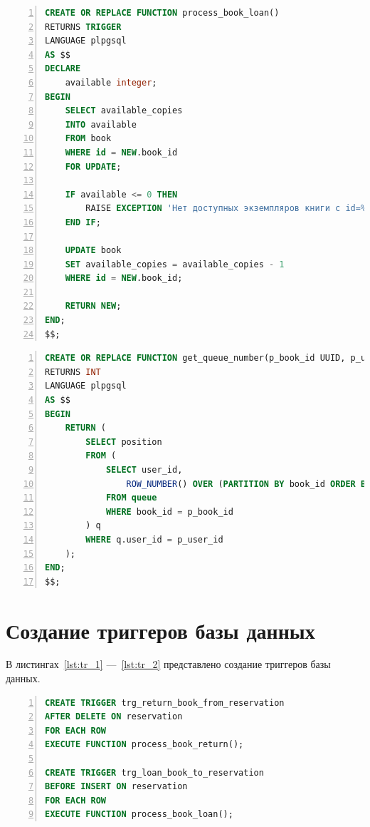 \begin{center}
	\captionsetup{justification=raggedright,singlelinecheck=off}
	\begin{lstlisting}[language=sql, frame=single, numbers=left, label=lst:func_2, caption=Создание функции process\_book\_loan]
CREATE OR REPLACE FUNCTION process_book_loan()
RETURNS TRIGGER
LANGUAGE plpgsql
AS $$
DECLARE
	available integer;
BEGIN
	SELECT available_copies
	INTO available
	FROM book
	WHERE id = NEW.book_id
	FOR UPDATE;
	
	IF available <= 0 THEN
		RAISE EXCEPTION 'Нет доступных экземпляров книги с id=%', NEW.book_id;
	END IF;
	
	UPDATE book
	SET available_copies = available_copies - 1
	WHERE id = NEW.book_id;
	
	RETURN NEW;
END;
$$;

	\end{lstlisting}
\end{center}


\begin{center}
	\captionsetup{justification=raggedright,singlelinecheck=off}
	\begin{lstlisting}[language=sql, frame=single, numbers=left, label=lst:func_3, caption=Создание функции get\_queue\_number]
CREATE OR REPLACE FUNCTION get_queue_number(p_book_id UUID, p_user_id UUID)
RETURNS INT 
LANGUAGE plpgsql
AS $$
BEGIN
	RETURN (
		SELECT position
		FROM (
			SELECT user_id,
				ROW_NUMBER() OVER (PARTITION BY book_id ORDER BY created_at) AS position
			FROM queue
			WHERE book_id = p_book_id
		) q
		WHERE q.user_id = p_user_id
	);
END;
$$;

	\end{lstlisting}
\end{center}

\section{Создание триггеров базы данных}
В листингах~\ref{lst:tr_1} ---~\ref{lst:tr_2} представлено создание триггеров базы данных.

\begin{center}
	\captionsetup{justification=raggedright,singlelinecheck=off}
	\begin{lstlisting}[language=sql, frame=single, numbers=left, label=lst:tr_1, caption=Создание тригеров для таблицы reservation]
CREATE TRIGGER trg_return_book_from_reservation
AFTER DELETE ON reservation
FOR EACH ROW
EXECUTE FUNCTION process_book_return();
		
CREATE TRIGGER trg_loan_book_to_reservation
BEFORE INSERT ON reservation
FOR EACH ROW
EXECUTE FUNCTION process_book_loan();
	\end{lstlisting}
\end{center}

